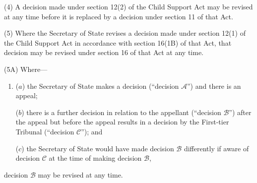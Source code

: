 \documentclass[12pt,a4paper]{article}
\begin{document}
(4) A decision made under section 12(2) of the Child Support Act may be revised at any time before it is replaced by a decision under section 11 of that Act.

(5) Where the 
Secretary of State  %
revises a decision made under section 12(1) of the Child Support Act in accordance with section 16(1B) of that Act, that decision may be revised under section 16 of that Act at any time.

(5A) Where—
\begin{enumerate}\item[]
($a$) the 
Secretary of State  %
makes a decision (“decision $\mathcal{A}$”) and there is an appeal;

($b$) there is a further decision in relation to the appellant (“decision $\mathcal{B}$”) after the appeal but before the appeal results in a decision by 
the First-tier Tribunal  %
(“decision $\mathcal{C}$”); and

($c$) the 
Secretary of State  %
would have made decision $\mathcal{B}$ differently if 
aware of decision $\mathcal{C}$ at the time 
of making  %
decision $\mathcal{B}$,
\end{enumerate}
decision $\mathcal{B}$ may be revised at any time.

%
%
\end{document}
